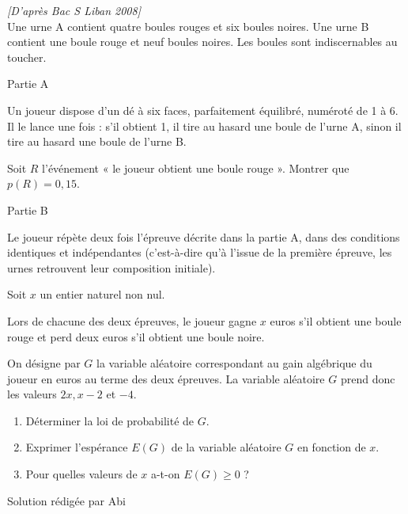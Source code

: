 
%
\textit{[D'après Bac S Liban 2008]}
\\\medskip
Une urne A contient quatre boules rouges et six boules noires. Une urne B contient une boule rouge et neuf boules noires. Les boules sont indiscernables au toucher.
\begin{h3}Partie A\end{h3}
Un joueur dispose d'un dé à six faces, parfaitement équilibré, numéroté de 1 à 6. Il le lance une fois : s'il obtient 1, il tire au hasard une boule de l'urne A, sinon il tire au hasard une boule de l'urne B.
\par
Soit $R$ l'événement « le joueur obtient une boule rouge ». Montrer que $p\left(R\right)=0,15$.
\begin{h3}Partie B\end{h3}
Le joueur répète deux fois l'épreuve décrite dans la partie A, dans des conditions identiques et indépendantes (c'est-à-dire qu'à l'issue de la première épreuve, les urnes retrouvent leur composition initiale).
\par
Soit $x$ un entier naturel non nul.
\par
Lors de chacune des deux épreuves, le joueur gagne $x$ euros s'il obtient une boule rouge et perd deux euros s'il obtient une boule noire.
\par
On désigne par $G$ la variable aléatoire correspondant au gain algébrique du joueur en euros au terme des deux épreuves. La variable aléatoire $G$ prend donc les valeurs $2x, x-2$ et $-4$.
\begin{enumerate}
     \item
     Déterminer la loi de probabilité de $G$.
     \item
     Exprimer l'espérance $E\left(G\right)$ de la variable aléatoire $G$ en fonction de $x$.
     \item
     Pour quelles valeurs de $x$ a-t-on $E\left(G\right) \geqslant  0$ ?
\end{enumerate}
\begin{corrige}
     Solution rédigée par Abi
     \par
{}%
\end{corrige}

